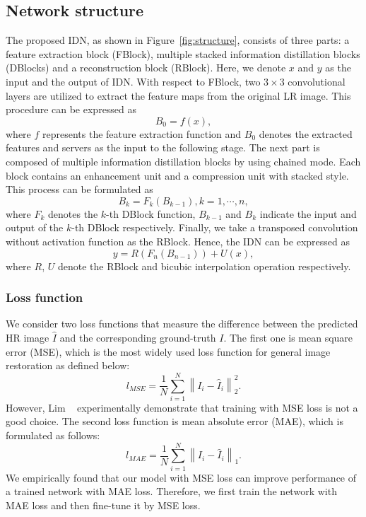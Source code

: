 \documentclass[10pt,twocolumn,letterpaper]{article}
\begin{document}
\subsection{Network structure}

The proposed IDN, as shown in Figure~\ref{fig:structure}, consists of three parts: a feature extraction block (FBlock), multiple stacked information distillation blocks (DBlocks) and a reconstruction block (RBlock). Here, we denote $x$ and $y$ as the input and the output of IDN. With respect to FBlock, two $3\times3$ convolutional layers are utilized to extract the feature maps from the original LR image. This procedure can be expressed as
\begin{equation}
{B_0} = f\left( x \right),
\end{equation}
where $f$ represents the feature extraction function and ${B_0}$ denotes the extracted features and servers as the input to the following stage. The next part is composed of multiple information distillation blocks by using chained mode. Each block contains an enhancement unit and a compression unit with stacked style. This process can be formulated as
\begin{equation}
{B_k} = {F_k}\left( {{B_{k - 1}}} \right),k = 1, \cdots ,n,
\end{equation}
where ${F_k}$ denotes the $k$-th DBlock function, ${{B_{k - 1}}}$ and ${B_k}$ indicate the input and output of the $k$-th DBlock respectively. Finally, we take a transposed convolution without activation function as the RBlock. Hence, the IDN can be expressed as
\begin{equation}
y = R\left( {{F_n}\left( {{B_{n - 1}}} \right)} \right) + U\left( x \right),
\end{equation}
where $R$, $U$ denote the RBlock and bicubic interpolation operation respectively.
\subsubsection{Loss function}
We consider two loss functions that measure the difference between the predicted HR image $\hat I$ and the corresponding ground-truth $I$. The first one is mean square error (MSE), which is the most widely used loss function for general image restoration as defined below:
\begin{equation}
{l_{MSE}} = \frac{1}{N}\sum\limits_{i = 1}^N {\left\| {{I_i} - {{\hat I}_i}} \right\|_2^2}.
\end{equation}
However, Lim \etal~\cite{EDSR} experimentally demonstrate that training with MSE loss is not a good choice. The second loss function is mean absolute error (MAE), which is formulated as follows:
\begin{equation}
{l_{MAE}} = \frac{1}{N}\sum\limits_{i = 1}^N {{{\left\| {{I_i} - {{\hat I}_i}} \right\|}_1}}.
\end{equation}
We empirically found that our model with MSE loss can improve performance of a trained network with MAE loss. Therefore, we first train the network with MAE loss and then fine-tune it by MSE loss.
\end{document}
